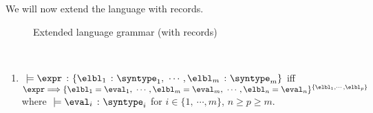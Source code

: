 We will now extend the language with records.


\begin{figure}[hbt!]%
  \begin{grammar}
            \grule[values]{\eval}{
              \cdots
              \gor \{\overline{\elbl = \eval}\}^{\{\overline{\elbl}\}}
            }
            \grule[types]{\syntype}{
              \cdots
              \gor \{\overline{\hastype{\elbl}{\syntype}}\} 
          }
        \end{grammar}
    \caption{Extended language grammar (with records)}
    \label{rec_Grammar}
\end{figure}

\begin{definition}
  \label{def_typingRec}
  \ \par
  \begin{enumerate}
      \item $\ \models \hastype{\expr}{\{\hastype{\elbl_1}{\syntype_1},\ \cdots, \hastype{\elbl_m}{\syntype_m}\}}$ iff $\expr \bigstep \{\elbl_1 = \eval_1,\ \cdots, \elbl_m = \eval_m,\ \cdots, \elbl_n = \eval_n\}^{\{\elbl_1, \cdots, \elbl_p\}}$ where $\ \models \hastype{\eval_i}{\syntype_i}$ for $i \in \{1,\ \cdots, m\}$, $n \geq p \geq m$.
  \end{enumerate}
\end{definition}

